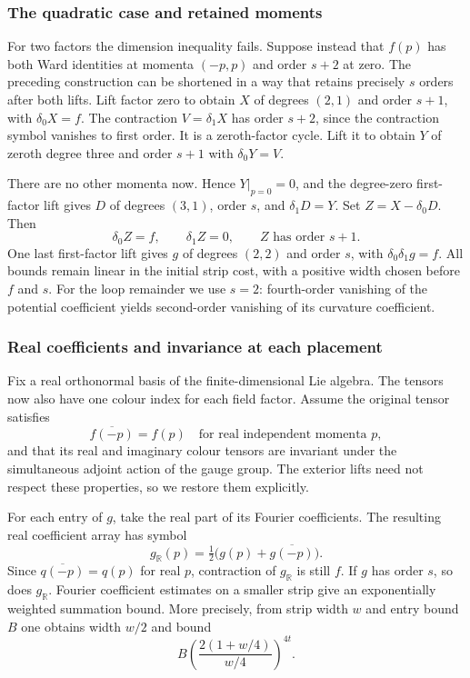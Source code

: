 \subsubsection{The quadratic case and retained moments}
For two factors the dimension inequality fails. Suppose instead
that $f(p)$ has both Ward identities at momenta $(-p,p)$ and
order $s+2$ at zero. The preceding construction can be shortened
in a way that retains precisely $s$ orders after both lifts.
Lift factor zero to obtain $X$ of degrees $(2,1)$ and order
$s+1$, with $\delta_0X=f$. The contraction
$V=\delta_1X$ has order $s+2$, since the contraction symbol
vanishes to first order. It is a zeroth-factor cycle.
Lift it to obtain $Y$ of zeroth degree three and order $s+1$
with $\delta_0Y=V$.

There are no other momenta now. Hence $Y|_{p=0}=0$, and the
degree-zero first-factor lift gives $D$ of degrees $(3,1)$,
order $s$, and $\delta_1D=Y$. Set $Z=X-\delta_0D$.
Then
\[
       \delta_0Z=f,\qquad \delta_1Z=0,
                   \qquad Z\text{ has order }s+1.
\]
One last first-factor lift gives $g$ of degrees $(2,2)$ and
order $s$, with $\delta_0\delta_1g=f$. All bounds remain linear
in the initial strip cost, with a positive width chosen before
$f$ and $s$. For the loop remainder we use $s=2$: fourth-order
vanishing of the potential coefficient yields second-order
vanishing of its curvature coefficient.

\subsubsection{Real coefficients and invariance at each placement}
Fix a real orthonormal basis of the finite-dimensional Lie algebra.
The tensors now also have one colour index for each field factor.
Assume the original tensor satisfies
\[
             \overline{f(-p)}=f(p)
                 \quad\text{for real independent momenta }p,
\]
and that its real and imaginary colour tensors are invariant
under the simultaneous adjoint action of the gauge group.
The exterior lifts need not respect these properties, so we
restore them explicitly.

For each entry of $g$, take the real part of its Fourier
coefficients. The resulting real coefficient array has symbol
\[
                   g_{\mathbb R}(p)
                      =\tfrac12\bigl(g(p)+\overline{g(-p)}\bigr).
\]
Since $\overline{q(-p)}=q(p)$ for real $p$, contraction of
$g_{\mathbb R}$ is still $f$. If $g$ has order $s$, so does
$g_{\mathbb R}$. Fourier coefficient estimates on a smaller strip
give an exponentially weighted summation bound. More precisely,
from strip width $w$ and entry bound $B$ one obtains width $w/2$
and bound
\[
 B\left(\frac{2(1+w/4)}{w/4}\right)^{4t}.
\]

